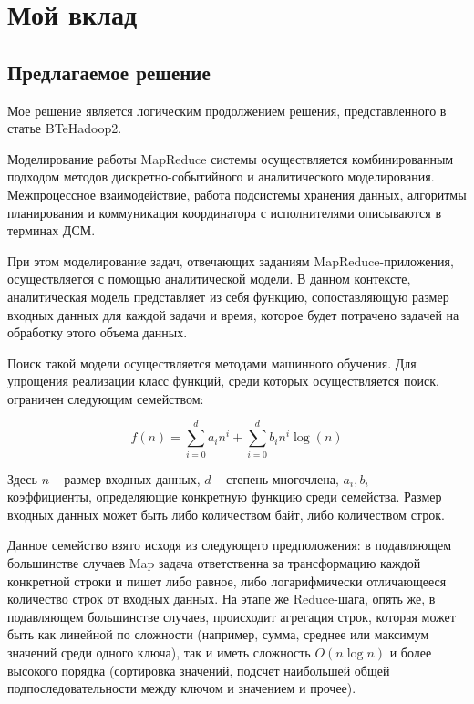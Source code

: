 \documentclass[../diploma.tex]{subfile}
\begin{document}
    \section{Мой вклад}\label{sec:results}

    \subsection{Предлагаемое решение}
    \label{sec:results:subsec:proposal}

    Мое решение является логическим продолжением решения, представленного в
    статье BTeHadoop2\cite{baseline_model}. 

    Моделирование работы MapReduce системы осуществляется комбинированным
    подходом методов дискретно-событийного и аналитического моделирования.
    Межпроцессное взаимодействие, работа подсистемы хранения данных, алгоритмы
    планирования и коммуникация координатора с исполнителями описываются в
    терминах ДСМ. 
    
    При этом моделирование задач, отвечающих заданиям MapReduce-приложения,
    осуществляется с помощью аналитической модели. В данном контексте,
    аналитическая модель представляет из себя функцию, сопоставляющую размер
    входных данных для каждой задачи и время, которое будет потрачено задачей на
    обработку этого объема данных.

    Поиск такой модели осуществляется методами машинного обучения. Для упрощения
    реализации класс функций, среди которых осуществляется поиск, ограничен
    следующим семейством:
    
    \begin{equation} 
        \label{eq:model}
        f(n) = \sum_{i = 0}^d a_in^i + \sum_{i=0}^d b_in^i\log(n)
    \end{equation} 

    Здесь $n$ -- размер входных данных, $d$ -- степень многочлена, $a_i, b_i$ --
    коэффициенты, определяющие конкретную функцию среди семейства. Размер
    входных данных может быть либо количеством байт, либо количеством строк.

    Данное семейство взято исходя из следующего предположения: в подавляющем
    большинстве случаев Map задача ответственна за трансформацию каждой
    конкретной строки и пишет либо равное, либо логарифмически отличающееся
    количество строк от входных данных. На этапе же Reduce-шага, опять же, в
    подавляющем большинстве случаев, происходит агрегация строк, которая может
    быть как линейной по сложности (например, сумма, среднее или максимум
    значений среди одного ключа), так и иметь сложность $O(n\log n)$ и более
    высокого порядка (сортировка значений, подсчет наибольшей общей
    подпоследовательности между ключом и значением и прочее).
\end{document}
